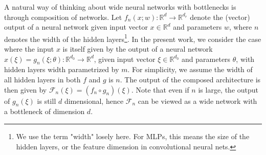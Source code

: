 \documentclass{article}
\theoremstyle{definition}
\theoremstyle{remark}
\renewcommand{\[}{\begin{eqnarray}}
\renewcommand{\]}{\end{eqnarray}}
\renewcommand{\[}{\begin{eqnarray}}
\renewcommand{\]}{\end{eqnarray}}
\newcommand{\R}{\mathbb{R}}
\newcommand{\F}{\mathcal{F}}
\begin{document}
A natural way of thinking about wide neural networks with bottlenecks is through composition of networks. Let $f_n(x;w):\R^{d} \to \R^{d_r}$ denote the (vector) output of a neural network given input vector $x \in \R^d$ and parameters $w$, where $n$ denotes the width of the hidden layers\footnote{We use the term "width" losely here. For MLPs, this means the size of the hidden layers, or the feature dimension in convolutional neural nets.}. 
In the present work, we consider the case where the input $x$ is itself given by the output of a neural network $x(\xi) = g_n(\xi;\theta): \R^{d_0} \to \R^d$, given input vector $\xi \in \R^{d_0}$ and parameters $\theta$, with hidden layers width parametrized by $m$. For simplicity, we assume the width of all hidden layers in both $f$ and $g$ is $n$. The output of the composed architecture is then given by $\F_n(\xi) = (f_n \circ g_n)(\xi)$. Note that even if $n$ is large, the output of $g_n(\xi)$ is still $d$ dimensional, hence $\F_n$ can be viewed as a wide network with a bottleneck of dimension $d$. \\
\end{document}
